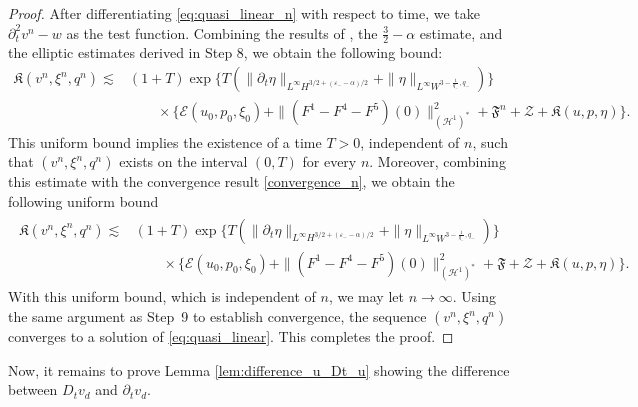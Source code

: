 \documentclass[letterpaper,reqno,10pt,twoside]{amsart}
\theoremstyle{definition}
\theoremstyle{remark}
\def\p{\partial}
\begin{document}
\begin{proof}
{			After differentiating \eqref{eq:quasi_linear_n} with respect to time, we take $\partial_{t}^{2}v^{n} - w$ as the test function. Combining the results of \cite[Section 10.2]{GT2020}, the $\frac{3}{2}-\alpha$ estimate, and the elliptic estimates derived in Step 8, we obtain the following bound:
			\[
			\begin{aligned}
				\mathfrak{K}(v^{n},\xi^{n},q^{n})\lesssim&(1+T)\exp\big\{T(\|\p_t\eta\|_{L^\infty H^{3/2+(\varepsilon_--\alpha)/2}}+\|\eta\|_{L^{\infty}W^{3-\frac{1}{q_{-}},q_{-}}})\big\}\\
				&\quad\quad \times\bigg\{ \mathcal{E}(u_{0},p_{0},\xi_{0}) +\|(F^1-F^4-F^5)(0)\|^{2}_{(\mathcal{H}^1)^\ast}+\mathfrak{F}^{n}+\mathcal{Z}+\mathfrak{K}(u,p,\eta)\bigg\}.
			\end{aligned}
			\]
			\noindent This uniform bound implies the existence of a time \(T>0\), independent of \(n\), such that \((v^{n},\xi^{n},q^{n})\) exists on the interval \((0,T)\) for every \(n\). Moreover, combining this estimate with the convergence result \eqref{convergence_n}, we obtain the following uniform bound
			\begin{align}
				\begin{aligned}
					\mathfrak{K}(v^{n},\xi^{n},q^{n})\lesssim&(1+T)\exp\big\{T(\|\p_t\eta\|_{L^\infty H^{3/2+(\varepsilon_--\alpha)/2}}+\|\eta\|_{L^{\infty}W^{3-\frac{1}{q_{-}},q_{-}}})\big\}\\
					&\quad\quad \times \bigg\{ \mathcal{E}(u_{0},p_{0},\xi_{0}) +\|(F^1-F^4-F^5)(0)\|^{2}_{(\mathcal{H}^1)^\ast}+\mathfrak{F}+\mathcal{Z}+\mathfrak{K}(u,p,\eta)\bigg\}.
				\end{aligned}
			\end{align}
			\noindent With this uniform bound, which is independent of $n$, we may let $n\to\infty$.
			Using the same argument as Step~9 to establish convergence,
			the sequence $(v^{n},\xi^{n},q^{n})$ converges to a solution of
			\eqref{eq:quasi_linear}. This completes the proof.}
	\end{proof}
	
	Now, it remains to prove Lemma \ref{lem:difference_u_Dt_u} showing the difference between $D_{t}v_{d}$ and $\p_{t}v_{d}$.
	
\end{document}

